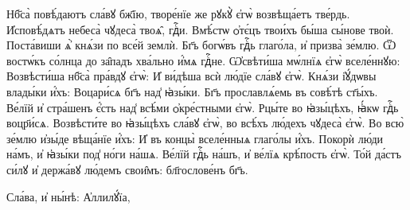 \cuLettrine
Нб҃са̀ повѣ́даютъ сла́вꙋ бж҃їю, творе́нїе же рꙋкꙋ̀  є҆гѡ̀ возвѣща́етъ тве́рдь. 
\hKv И҆сповѣ́дѧтъ небеса̀  чꙋдеса̀ твоѧ̑, гдⷭ҇и. 
\hKv Вмѣ́стѡ ѻ҆тє́цъ твои́хъ бы́ша  сы́нове твоѝ. 
\hKv Поста́виши ѧ҆̀ кнѧ́зи по все́й землѝ.  
\hKv Бг҃ъ богѡ́въ гдⷭ҇ь глаго́ла, и҆ призва̀ зе́млю. 
\hKv  Ѿ востѡ́къ со́лнца до за̑падъ хва́льно и҆́мѧ гдⷭ҇не. 
\hKv  Ѡ҆свѣти́ша  мѡ́лнїѧ є҆гѡ̀  вселе́ннꙋю: 
\hKv Возвѣсти́ша нб҃са̀ пра́вдꙋ є҆гѡ̀: 
\hKv И҆  ви́дѣша всѝ лю́дїе сла́вꙋ є҆гѡ̀. 
\hKv Кнѧ́зи і҆ꙋ́дѡвы  влады́ки и҆́хъ: 
\hKv Воцари́сѧ бг҃ъ над̾ ꙗ҆зы́ки. 
\hKv  Бг҃ъ прославлѧ́емь въ совѣ́тѣ ст҃ы́хъ. 
\hKv Ве́лїй и҆  стра́шенъ є҆́сть над̾ всѣ́ми ѻ҆кре́стными є҆гѡ̀. 
\hKv  Рцы́те во ꙗ҆зы́цѣхъ, ꙗ҆́кѡ гдⷭ҇ь воцр҃и́сѧ. 
\hKv  Возвѣсти́те во ꙗ҆зы́цѣхъ сла́вꙋ є҆гѡ̀, во всѣ́хъ  лю́дехъ чꙋдеса̀ є҆гѡ̀. 
\hKv Во всю̀ зе́млю и҆зы́де  вѣща́нїе и҆́хъ: 
\hKv И҆ въ концы̀ вселе́нныѧ глаго́лы  и҆́хъ. 
\hKv Покорѝ лю́ди на́мъ, и҆ ꙗ҆зы́ки под̾ но́ги  на́шѧ. 
\hKv Ве́лїй гдⷭ҇ь на́шъ, и҆ ве́лїѧ крѣ́пость є҆гѡ̀.  
\hKv То́й да́стъ си́лꙋ и҆ держа́вꙋ лю́демъ свои̑мъ:  бл҃гослове́нъ бг҃ъ. 

\hKv Сла́ва, и҆ ны́нѣ: А҆ллилꙋ́їа,  





